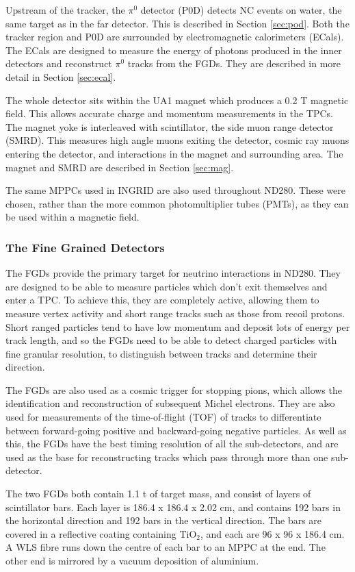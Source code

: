 Upstream of the tracker, the $\pi^0$ detector (P0D) detects NC events on water, the same target as in the far detector. This is described in Section \ref{sec:pod}. Both the tracker region and P0D are surrounded by electromagnetic calorimeters (ECals). The ECals are designed to measure the energy of photons produced in the inner detectors and reconstruct $\pi^0$ tracks from the FGDs. They are described in more detail in Section \ref{sec:ecal}.

The whole detector sits within the UA1 magnet which produces a 0.2 T magnetic field. This allows accurate charge and momentum measurements in the TPCs. The magnet yoke is interleaved with scintillator, the side muon range detector (SMRD). This measures high angle muons exiting the detector, cosmic ray muons entering the detector, and interactions in the magnet and surrounding area. The magnet and SMRD are described in Section \ref{sec:mag}.

The same MPPCs used in INGRID are also used throughout ND280. These were chosen, rather than the more common photomultiplier tubes (PMTs), as they can be used within a magnetic field. 

\subsubsection{The Fine Grained Detectors}\label{sec:fgd}

The FGDs provide the primary target for neutrino interactions in ND280. They are designed to be able to measure particles which don't exit themselves and enter a TPC. To achieve this, they are completely active, allowing them to measure vertex activity and short range tracks such as those from recoil protons. Short ranged particles tend to have low momentum and deposit lots of energy per track length, and so the FGDs need to be able to detect charged particles with fine granular resolution, to distinguish between tracks and determine their direction. 

The FGDs are also used as a cosmic trigger for stopping pions, which allows the identification and reconstruction of subsequent Michel electrons. They are also used for measurements of the time-of-flight (TOF) of tracks to differentiate between forward-going positive and backward-going negative particles. As well as this, the FGDs have the best timing resolution of all the sub-detectors, and are used as the base for reconstructing tracks which pass through more than one sub-detector. 

The two FGDs both contain 1.1 t of target mass, and consist of layers of scintillator bars. Each layer is 186.4 x 186.4 x 2.02 cm, and contains 192 bars in the horizontal direction and 192 bars in the vertical direction. The bars are covered in a reflective coating containing TiO$_2$, and each are 96 x 96 x 186.4 cm. A WLS fibre runs down the centre of each bar to an MPPC at the end. The other end is mirrored by a vacuum deposition of aluminium.

